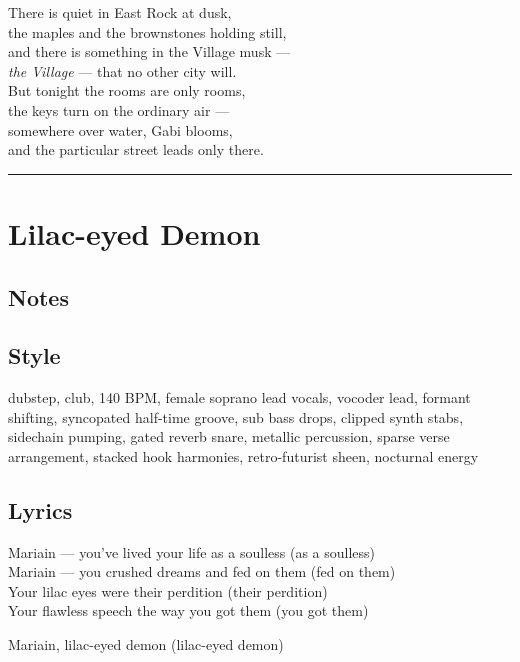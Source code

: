 There is quiet in East Rock at dusk,\\
the maples and the brownstones holding still,\\
and there is something in the Village musk ---\\
\emph{the Village} --- that no other city will.\\
But tonight the rooms are only rooms,\\
the keys turn on the ordinary air ---\\
somewhere over water, Gabi blooms,\\
and the particular street leads only there.

\begin{center}\rule{0.5\linewidth}{0.5pt}\end{center}

\section{Lilac-eyed Demon}\label{lilac-eyed-demon}

\subsection{Notes}\label{notes-31}

\subsection{Style}\label{style-30}

dubstep, club, 140 BPM, female soprano lead vocals, vocoder lead,
formant shifting, syncopated half-time groove, sub bass drops, clipped
synth stabs, sidechain pumping, gated reverb snare, metallic percussion,
sparse verse arrangement, stacked hook harmonies, retro-futurist sheen,
nocturnal energy

\subsection{Lyrics}\label{lyrics-30}

Mariain --- you've lived your life as a soulless (as a soulless)\\
Mariain --- you crushed dreams and fed on them (fed on them)\\
Your lilac eyes were their perdition (their perdition)\\
Your flawless speech the way you got them (you got them)

Mariain, lilac-eyed demon (lilac-eyed demon)

